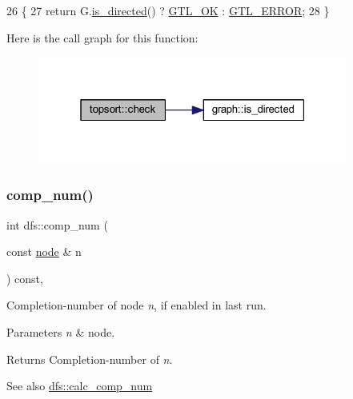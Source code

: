 \begin{DoxyCode}
26 \{
27     \textcolor{keywordflow}{return} G.\mbox{\hyperlink{classgraph_afc510be7479fa903fde9e0e615470ab0}{is\_directed}}() ? \mbox{\hyperlink{classalgorithm_af1a0078e153aa99c24f9bdf0d97f6710a5114c20e4a96a76b5de9f28bf15e282b}{GTL\_OK}} : \mbox{\hyperlink{classalgorithm_af1a0078e153aa99c24f9bdf0d97f6710a6fcf574690bbd6cf710837a169510dd7}{GTL\_ERROR}};
28 \}
\end{DoxyCode}
Here is the call graph for this function\+:\nopagebreak
\begin{figure}[H]
\begin{center}
\leavevmode
\includegraphics[width=289pt]{classtopsort_a777a9a68c4081d22e7b698ed3c515343_cgraph}
\end{center}
\end{figure}
\mbox{\label{classdfs_aceb066c806cb0beb5688b167a17387c7}} 
\subsubsection{\texorpdfstring{comp\+\_\+num()}{comp\_num()}}
{\footnotesize\ttfamily int dfs\+::comp\+\_\+num (\begin{DoxyParamCaption}\item[{const \mbox{\hyperlink{classnode}{node}} \&}]{n }\end{DoxyParamCaption}) const\hspace{0.3cm}{\ttfamily [inline]}, {\ttfamily [inherited]}}



Completion-\/number of node {\itshape n}, if enabled in last run. 


\begin{DoxyParams}{Parameters}
{\em n} & node. \\
\hline
\end{DoxyParams}
\begin{DoxyReturn}{Returns}
Completion-\/number of {\itshape n}. 
\end{DoxyReturn}
\begin{DoxySeeAlso}{See also}
\mbox{\hyperlink{classdfs_a70862ea715c52eb95fb704afd3a6e676}{dfs\+::calc\+\_\+comp\+\_\+num}} 
\end{DoxySeeAlso}


